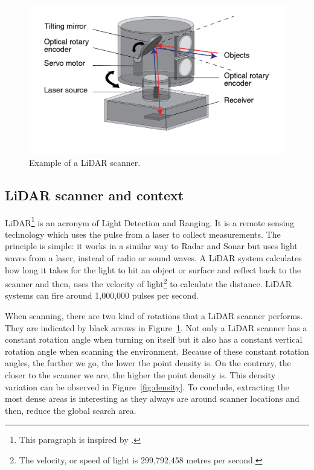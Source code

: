 \begin{figure}
  \centering
  \includegraphics[scale=1]{img/lidar.jpg}
  \caption{Example of a LiDAR scanner.}
  \label{fig:lidar}
\end{figure}


\subsection{LiDAR scanner and context}
\label{subsc:lidar}
LiDAR\footnote{This paragraph is inspired by \cite{lidar}.} is an acronym of Light Detection and Ranging. It is a remote sensing technology which uses the pulse from a laser to collect measurements. The principle is simple: it works in a similar way to Radar and Sonar but uses light waves from a laser, instead of radio or sound waves. A LiDAR system calculates how long it takes for the light to hit an object or surface and reflect back to the scanner and then, uses the velocity of light\footnote{The velocity, or speed of light is 299,792,458 metres
per second.} to calculate the distance. LiDAR systems can fire around 1,000,000 pulses per second.

When scanning, there are two kind of rotations that a LiDAR scanner performs. They are indicated by black arrows in Figure~\ref{fig:lidar}. Not only a LiDAR scanner has a constant rotation angle when turning on itself but it also has a constant vertical rotation angle when scanning the environment. Because of these constant rotation angles, the further we go, the lower the point density is. On the contrary, the closer to the scanner we are, the higher the point density is. This density variation can be observed in
Figure~\ref{fig:density}. To conclude, extracting the most dense areas is interesting as they always are around scanner locations and then, reduce the global search area.


